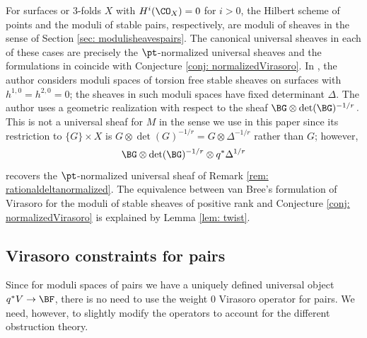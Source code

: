 \begin{remark}
\notready\label{rem: normalizedpt}
For surfaces or 3-folds $X$ with $H^i(\CO_X)=0$ for $i>0$, the Hilbert scheme of points and the moduli of stable pairs, respectively, are moduli of sheaves in the sense of Section \ref{sec: modulisheavespairs}. The canonical universal sheaves in each of these cases are precisely the $\pt$-normalized universal sheaves and the formulations in \cite{moop,moreira} coincide with Conjecture \ref{conj: normalizedVirasoro}. In \cite{bree}, the author considers moduli spaces of torsion free stable sheaves on surfaces with $h^{1,0}=h^{2,0}=0$; the sheaves in such moduli spaces have fixed determinant $\Delta$. The author uses a geometric realization with respect to the sheaf
$\BG\otimes \det(\BG)^{-1/r}\,.$
This is not a universal sheaf for $M$ in the sense we use in this paper since its restriction to $\{G\}\times X$ is $G\otimes \det(G)^{-1/r}=G\otimes \Delta^{-1/r}$ rather than $G$; however,
\[\BG\otimes \det(\BG)^{-1/r}\otimes q^\ast\Delta^{1/r}\]
recovers the $\pt$-normalized universal sheaf of Remark \ref{rem: rationaldeltanormalized}. The equivalence between van Bree's formulation of Virasoro for the moduli of stable sheaves of positive rank and Conjecture \ref{conj: normalizedVirasoro} is explained by Lemma \ref{lem: twist}.
\end{remark}

\subsection{Virasoro constraints for pairs}
\label{sec: virasoropairs}

Since for moduli spaces of pairs we have a uniquely defined universal object $q^\ast V\to \BF$, there is no need to use the weight 0 Virasoro operator for pairs. We need, however, to slightly modify the operators to account for the different obstruction theory.

